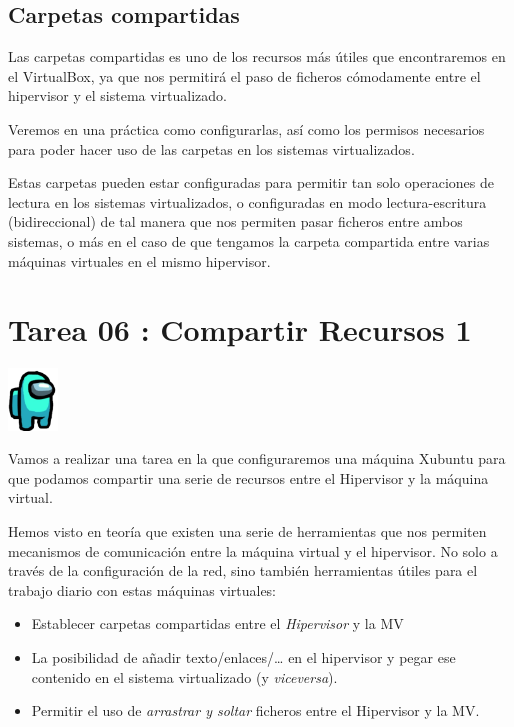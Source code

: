 \documentclass[11pt]{article}
\begin{document}
\subsection{Carpetas compartidas}
\label{sec:org28b36f4}
Las carpetas compartidas es uno de los recursos más útiles que
encontraremos en el VirtualBox, ya que nos permitirá el paso de ficheros
cómodamente entre el hipervisor y el sistema virtualizado.

Veremos en una práctica como configurarlas, así como los permisos
necesarios para poder hacer uso de las carpetas en los sistemas
virtualizados.

Estas carpetas pueden estar configuradas para permitir tan solo
operaciones de lectura en los sistemas virtualizados, o configuradas en
modo lectura-escritura (bidireccional) de tal manera que nos permiten
pasar ficheros entre ambos sistemas, o más en el caso de que tengamos la
carpeta compartida entre varias máquinas virtuales en el mismo
hipervisor.


\newpage


\section{Tarea 06 : Compartir Recursos 1}
\label{sec:org86ddd83}

\begin{center}
\includegraphics[width=50px]{imgs/amongus.png}
\end{center}

Vamos a realizar una tarea en la que configuraremos una máquina Xubuntu
para que podamos compartir una serie de recursos entre el Hipervisor y
la máquina virtual.

Hemos visto en teoría que existen una serie de herramientas que nos
permiten mecanismos de comunicación entre la máquina virtual y el
hipervisor. No solo a través de la configuración de la red, sino también
herramientas útiles para el trabajo diario con estas máquinas virtuales:

\begin{itemize}
\item Establecer carpetas compartidas entre el \emph{Hipervisor} y la MV
\item La posibilidad de añadir texto/enlaces/\ldots{} en el hipervisor y pegar
ese contenido en el sistema virtualizado (y \emph{viceversa}).
\item Permitir el uso de \emph{arrastrar y soltar} ficheros entre el Hipervisor y
la MV.
\end{itemize}
\end{document}
